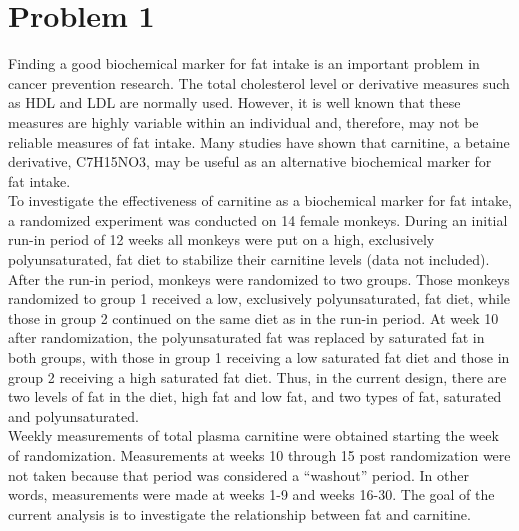 
	
	\noindent \section{Problem 1} 

Finding a good biochemical marker for fat intake is an important problem in cancer
							prevention research. The total cholesterol level or derivative measures such as HDL and
							LDL are normally used. However, it is well known that these measures are highly variable
							within an individual and, therefore, may not be reliable measures of fat intake. Many
							studies have shown that carnitine, a betaine derivative, C7H15NO3, may be useful as an
							alternative biochemical marker for fat intake. \\
							
							\vspace{0.2cm} 
	\noindent  	To investigate the effectiveness of carnitine as a biochemical marker for fat intake, a
							randomized experiment was conducted on 14 female monkeys. During an initial run-in
							period of 12 weeks all monkeys were put on a high, exclusively polyunsaturated, fat diet
							to stabilize their carnitine levels (data not included). After the run-in period, monkeys were randomized to
							two groups. Those monkeys randomized to group 1 received a low, exclusively polyunsaturated,
							fat diet, while those in group 2 continued on the same diet as in the run-in period.
							At week 10 after randomization, the polyunsaturated fat was replaced by saturated fat in
							both groups, with those in group 1 receiving a low saturated fat diet and those in group
							2 receiving a high saturated fat diet. Thus, in the current design, there are two levels of
							fat in the diet, high fat and low fat, and two types of fat, saturated and polyunsaturated. \\
				
							\vspace{0.2cm} 
	\noindent 	Weekly measurements of total plasma carnitine were obtained starting the week of randomization.
							Measurements at weeks 10 through 15 post randomization were not taken
							because that period was considered a “washout” period. In other words, measurements
							were made at weeks 1-9 and weeks 16-30. The goal of the current analysis is to investigate
							the relationship between fat and carnitine. \\
				
